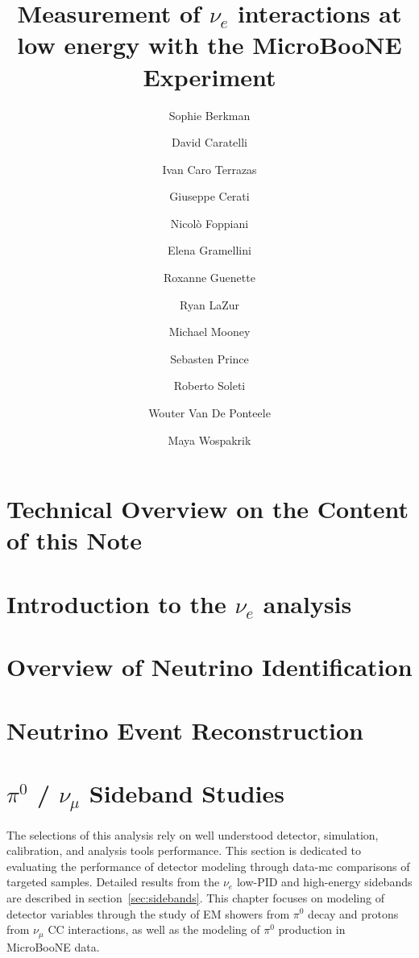 \documentclass[a4paper]{article}
\title{Measurement of $\nu_e$ interactions at low energy with the MicroBooNE Experiment}
\author[1]{Sophie Berkman}
\author[1]{David Caratelli}
\author[2]{Ivan Caro Terrazas}
\author[1]{Giuseppe Cerati}
\author[3]{Nicol\`o Foppiani}
\author[1]{Elena Gramellini}
\author[3]{Roxanne Guenette}
\author[2]{Ryan LaZur}
\author[2]{Michael Mooney}
\author[3]{Sebasten Prince}
\author[3,4]{Roberto Soleti}
\author[3,4]{Wouter Van De Ponteele}
\author[1]{Maya Wospakrik}
\affil[1]{Fermi National Accelerator Laboratory}
\affil[2]{Colorado State University}
\affil[3]{Harvard University}
\affil[4]{University of Oxford}
\newcommand{\numu}{$\nu_{\mu}$\xspace}
\begin{document}
\maketitle


\tableofcontents

\newpage
\section{Technical Overview on the Content of this Note}

\newpage

\section{Introduction to the $\nu_e$ analysis}

\newpage

\section{Overview of Neutrino Identification}
\label{sec:sliceID}

\newpage

\section{Neutrino Event Reconstruction}
\label{sec:NuEvtReco}

\newpage

\section{$\pi^0$ / \numu Sideband Studies}
\label{sec:controls}

\par The selections of this analysis rely on well understood detector, simulation, calibration, and analysis tools performance. This section is dedicated to evaluating the performance of detector modeling through data-mc comparisons of targeted samples. Detailed results from the $\nu_e$ low-PID and high-energy sidebands are described in section~\ref{sec:sidebands}. This chapter focuses on modeling of detector variables through the study of EM showers from $\pi^0$ decay and protons from $\nu_{\mu}$ CC interactions, as well as the modeling of $\pi^0$ production in MicroBooNE data.
\end{document}

